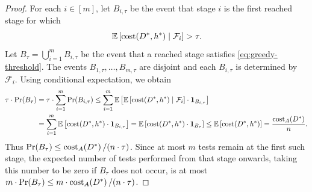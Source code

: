 \begin{proof}
For each $i\in[m]$, let $B_{i,\tau}$ be the event that stage $i$ is the first reached stage for which
\begin{equation}\label{eq:greedy-threshold}
    \mathbb{E}\left[\operatorname{cost}\mathopen{}\left( D^*,h^* \right)\mid\mathcal{F}_i\right]>\tau.
\end{equation}
Let $B_{\tau}=\bigcup_{i=1}^{m}B_{i,\tau}$ be the event that a reached stage satisfies \eqref{eq:greedy-threshold}. The events $B_{1,\tau},\ldots,B_{m,\tau}$ are disjoint and each $B_{i,\tau}$ is determined by $\mathcal{F}_i$. Using conditional expectation, we obtain
\begin{align*}
    \tau\cdot\Pr\mathopen{}\left( B_{\tau} \right)
    &=\tau\cdot\sum_{i=1}^{m}\Pr\mathopen{}\left( B_{i,\tau} \right)
    \leq\sum_{i=1}^{m}\mathbb{E}\left[
        \mathbb{E}\left[\operatorname{cost}\mathopen{}\left( D^*,h^* \right)\mid\mathcal{F}_i\right]
        \cdot\mathbf{1}_{B_{i,\tau}}\right]\\
    &=\sum_{i=1}^{m}\mathbb{E}\left[\operatorname{cost}\mathopen{}\left( D^*,h^* \right)\cdot\mathbf{1}_{B_{i,\tau}}\right]
    =\mathbb{E}\left[\operatorname{cost}\mathopen{}\left( D^*,h^* \right)\cdot\mathbf{1}_{B_{\tau}}\right]
    \leq\mathbb{E}\left[\operatorname{cost}\mathopen{}\left( D^*,h^* \right)\right]
    =\frac{\operatorname{cost}_A\mathopen{}\left( D^* \right)}{n}.
\end{align*}
Thus $\Pr\mathopen{}\left( B_{\tau} \right)\leq\operatorname{cost}_A\mathopen{}\left( D^* \right)/(n\cdot\tau)$. Since at most $m$ tests remain at the first such stage, the expected number of tests performed from that stage onwards, taking this number to be zero if $B_{\tau}$ does not occur, is at most $m\cdot\Pr\mathopen{}\left( B_{\tau} \right)\leq m\cdot\operatorname{cost}_A\mathopen{}\left( D^* \right)/(n\cdot\tau)$.


\end{proof}
